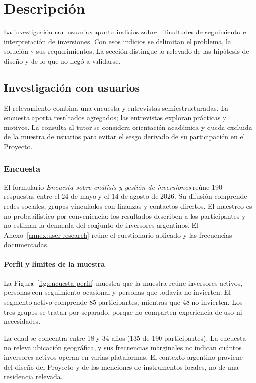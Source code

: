 \chapter{Descripción}\label{chap:descripcion}

La investigación con usuarios aporta indicios sobre dificultades de seguimiento e interpretación de inversiones. Con esos indicios se delimitan el problema, la solución y sus requerimientos. La sección distingue lo relevado de las hipótesis de diseño y de lo que no llegó a validarse.

\section{Investigación con usuarios}\label{sec:user-research}

El relevamiento combina una encuesta y entrevistas semiestructuradas. La encuesta aporta resultados agregados; las entrevistas exploran prácticas y motivos. La consulta al tutor se considera orientación académica y queda excluida de la muestra de usuarios para evitar el sesgo derivado de su participación en el Proyecto.

\subsection{Encuesta}\label{subsec:encuesta}

El formulario \textit{Encuesta sobre análisis y gestión de inversiones} reúne 190 respuestas entre el 24 de mayo y el 14 de agosto de 2026. Su difusión comprende redes sociales, grupos vinculados con finanzas y contactos directos. El muestreo es no probabilístico por conveniencia: los resultados describen a los participantes y no estiman la demanda del conjunto de inversores argentinos. El Anexo~\ref{annex:user-research} reúne el cuestionario aplicado y las frecuencias documentadas.

\subsubsection{Perfil y límites de la muestra}

La Figura~\ref{fig:encuesta-perfil} muestra que la muestra reúne inversores activos, personas con seguimiento ocasional y personas que todavía no invierten. El segmento activo comprende 85 participantes, mientras que 48 no invierten. Los tres grupos se tratan por separado, porque no comparten experiencia de uso ni necesidades.

La edad se concentra entre 18 y 34 años (135 de 190 participantes). La encuesta no releva ubicación geográfica, y sus frecuencias marginales no indican cuántos inversores activos operan en varias plataformas. El contexto argentino proviene del diseño del Proyecto y de las menciones de instrumentos locales, no de una residencia relevada.


